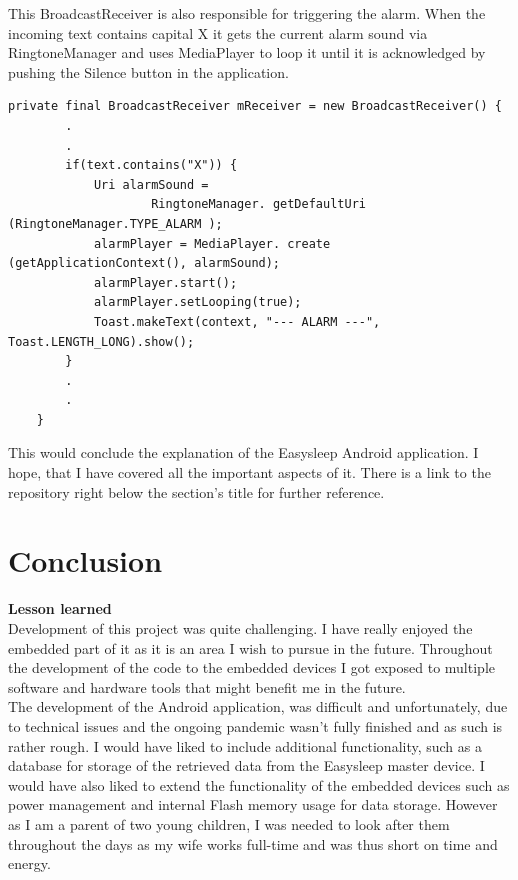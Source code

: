 \documentclass[12pt,a4paper]{article}
\begin{document}
    This BroadcastReceiver is also responsible for triggering the alarm. When the incoming text contains capital X it gets the current alarm sound via RingtoneManager and uses MediaPlayer to loop it until it is acknowledged by pushing the Silence button in the application.
    \begin{lstlisting}[label={lst:alarmTrig}, caption=Alarm handling]
    private final BroadcastReceiver mReceiver = new BroadcastReceiver() {
        .
        .
        if(text.contains("X")) {
            Uri alarmSound =
                    RingtoneManager. getDefaultUri (RingtoneManager.TYPE_ALARM );
            alarmPlayer = MediaPlayer. create (getApplicationContext(), alarmSound);
            alarmPlayer.start();
            alarmPlayer.setLooping(true);
            Toast.makeText(context, "--- ALARM ---", Toast.LENGTH_LONG).show();
        }
        .
        .
    }
    \end{lstlisting}

    
    This would conclude the explanation of the Easysleep Android application. I hope, that I have covered all the important aspects of it. There is a link to the repository right below the section's title for further reference.
    \newpage

    \section{Conclusion}
    {\bfseries Lesson learned}\\
    
    Development of this project was quite challenging. I have really enjoyed the embedded part of it as it is an area I wish to pursue in the future. Throughout the development of the code to the embedded devices I got exposed to multiple software and hardware tools that might benefit me in the future. \\
    
    The development of the Android application, was difficult and unfortunately, due to technical issues and the ongoing pandemic wasn't fully finished and as such is rather rough. I would have liked to include additional functionality, such as a database for storage of the retrieved data from the Easysleep master device. I would have also liked to extend the functionality of the embedded devices such as power management and internal Flash memory usage for data storage. However as I am a parent of two young children, I was needed to look after them throughout the days as my wife works full-time and was thus short on time and energy. \\
    
\end{document}
